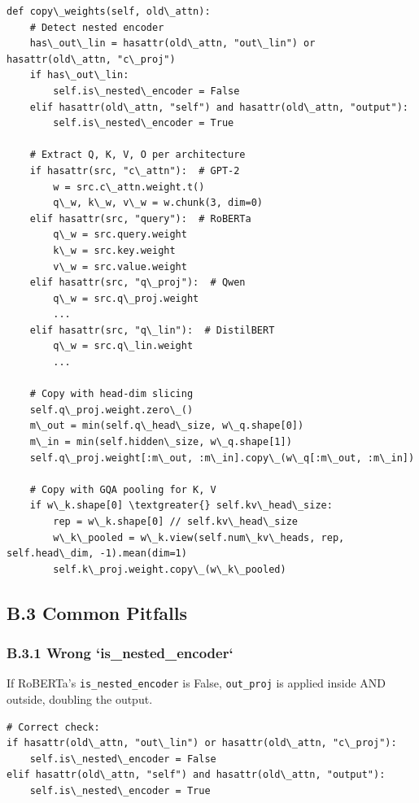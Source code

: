 \begin{lstlisting}
def copy\_weights(self, old\_attn):
    # Detect nested encoder
    has\_out\_lin = hasattr(old\_attn, "out\_lin") or hasattr(old\_attn, "c\_proj")
    if has\_out\_lin:
        self.is\_nested\_encoder = False
    elif hasattr(old\_attn, "self") and hasattr(old\_attn, "output"):
        self.is\_nested\_encoder = True
    
    # Extract Q, K, V, O per architecture
    if hasattr(src, "c\_attn"):  # GPT-2
        w = src.c\_attn.weight.t()
        q\_w, k\_w, v\_w = w.chunk(3, dim=0)
    elif hasattr(src, "query"):  # RoBERTa
        q\_w = src.query.weight
        k\_w = src.key.weight
        v\_w = src.value.weight
    elif hasattr(src, "q\_proj"):  # Qwen
        q\_w = src.q\_proj.weight
        ...
    elif hasattr(src, "q\_lin"):  # DistilBERT
        q\_w = src.q\_lin.weight
        ...
    
    # Copy with head-dim slicing
    self.q\_proj.weight.zero\_()
    m\_out = min(self.q\_head\_size, w\_q.shape[0])
    m\_in = min(self.hidden\_size, w\_q.shape[1])
    self.q\_proj.weight[:m\_out, :m\_in].copy\_(w\_q[:m\_out, :m\_in])
    
    # Copy with GQA pooling for K, V
    if w\_k.shape[0] \textgreater{} self.kv\_head\_size:
        rep = w\_k.shape[0] // self.kv\_head\_size
        w\_k\_pooled = w\_k.view(self.num\_kv\_heads, rep, self.head\_dim, -1).mean(dim=1)
        self.k\_proj.weight.copy\_(w\_k\_pooled)
\end{lstlisting}

\subsection{B.3 Common Pitfalls}

\subsubsection{B.3.1 Wrong `is\_nested\_encoder`}

If RoBERTa's \texttt{is\_nested\_encoder} is False, \texttt{out\_proj} is applied inside 
AND outside, doubling the output.

\begin{lstlisting}
# Correct check:
if hasattr(old\_attn, "out\_lin") or hasattr(old\_attn, "c\_proj"):
    self.is\_nested\_encoder = False
elif hasattr(old\_attn, "self") and hasattr(old\_attn, "output"):
    self.is\_nested\_encoder = True
\end{lstlisting}

